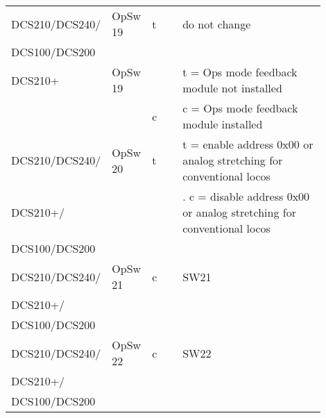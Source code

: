 \begin{tabular}{|p{0.2\linewidth}|p{0.125\linewidth}|p{0.1\linewidth}|p{0.475\linewidth}|}
\hline
DCS210/DCS240/ & OpSw 19 & t & do not change\\
DCS100/DCS200 &&&\\
\hline
DCS210+ & OpSw 19 &  & t = Ops mode feedback module not installed\\
&  & c & c = Ops mode feedback module installed\\
\hline
DCS210/DCS240/ & OpSw 20 & t & t = enable address 0x00 or analog stretching for conventional locos\\
DCS210+/&&&. c = disable address 0x00 or analog stretching for conventional locos\\
DCS100/DCS200 &&&\\
\hline
DCS210/DCS240/ & OpSw 21 & c & SW21\\
DCS210+/ &&&\\
DCS100/DCS200 &&&\\
\hline
DCS210/DCS240/ & OpSw 22 & c & SW22\\ 
DCS210+/ &&&\\
DCS100/DCS200 &&&\\
\hline
\end{tabular}
\newpage
